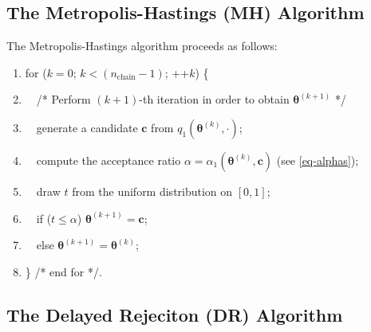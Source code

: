 \subsection{The Metropolis-Hastings (MH) Algorithm}%

The Metropolis-Hastings algorithm proceeds as follows:
\begin{enumerate}
\item for ($k=0$; $k < (n_{\text{chain}}-1)$; ++$k$) \{
\item $\quad$/* Perform $(k+1)$-th iteration in order to obtain $\boldsymbol{\theta}^{(k+1)}$ */
\item $\quad$generate a candidate $\mathbf{c}$ from $q_1(\boldsymbol{\theta}^{(k)},\cdot)$;
\item $\quad$compute the acceptance ratio $\alpha=\alpha_1(\boldsymbol{\theta}^{(k)},\mathbf{c})$ (see \eqref{eq-alphas});
\item $\quad$draw $t$ from the uniform distribution on $[0,1]$;
\item $\quad$if ($t\leqslant \alpha$) $\boldsymbol{\theta}^{(k+1)}=\mathbf{c}$;
\item $\quad$else $\boldsymbol{\theta}^{(k+1)}=\boldsymbol{\theta}^{(k)}$;
\item \} /* end for */.
\end{enumerate}

\subsection{The Delayed Rejeciton (DR) Algorithm}%

